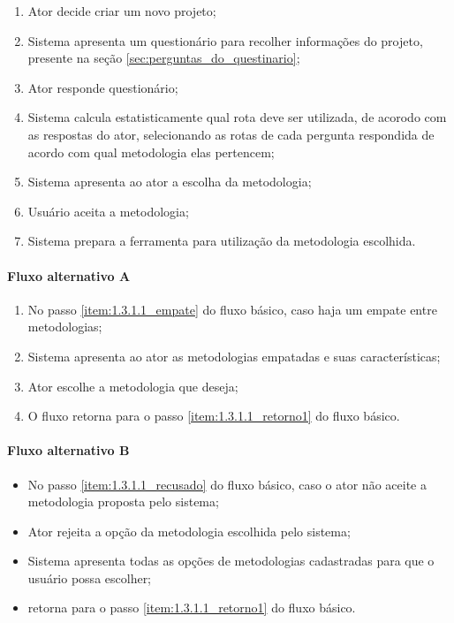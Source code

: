 	\begin{enumerate}
		\item Ator decide criar um novo projeto;
		\item Sistema apresenta um questionário para recolher informações do projeto, presente na seção \ref{sec:perguntas_do_questinario};
		\item Ator responde questionário;
		\item Sistema calcula estatisticamente qual rota deve ser utilizada, de acorodo com as respostas do ator, selecionando as rotas de cada pergunta respondida de acordo com qual metodologia elas pertencem;
			\label{item:1.3.1.1_empate}
		\item Sistema apresenta ao ator a escolha da metodologia;
		\item Usuário aceita a metodologia;
			\label{item:1.3.1.1_recusado}
		\item Sistema prepara a ferramenta para utilização da metodologia escolhida.
			\label{item:1.3.1.1_retorno1}
	\end{enumerate}

\paragraph{Fluxo alternativo A}

	\begin{enumerate}
		\item No passo \ref{item:1.3.1.1_empate} do fluxo básico, caso haja um empate entre metodologias;
		\item Sistema apresenta ao ator as metodologias empatadas e suas características;
		\item Ator escolhe a metodologia que deseja;
		\item O fluxo retorna para o passo \ref{item:1.3.1.1_retorno1} do fluxo básico.
	\end{enumerate}

\paragraph{Fluxo alternativo B}

	\begin{itemize}
		\item No passo \ref{item:1.3.1.1_recusado} do fluxo básico, caso o ator não aceite a metodologia proposta pelo sistema;
		\item Ator rejeita a opção da metodologia escolhida pelo sistema;
		\item Sistema apresenta todas as opções de metodologias cadastradas para que o usuário possa escolher;
		\item retorna para o passo \ref{item:1.3.1.1_retorno1} do fluxo básico.
	\end{itemize}

